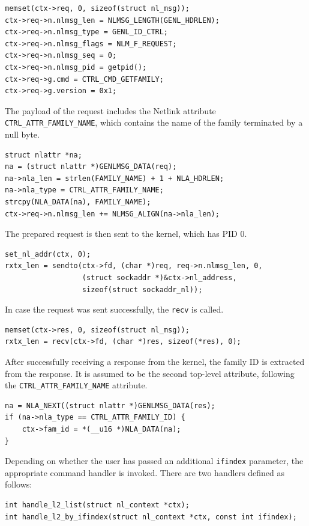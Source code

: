 \documentclass[10pt, letterpaper]{article}
\begin{document}
\begin{lstlisting}[caption={Request message initialization}]
memset(ctx->req, 0, sizeof(struct nl_msg));
ctx->req->n.nlmsg_len = NLMSG_LENGTH(GENL_HDRLEN);
ctx->req->n.nlmsg_type = GENL_ID_CTRL;
ctx->req->n.nlmsg_flags = NLM_F_REQUEST;
ctx->req->n.nlmsg_seq = 0;
ctx->req->n.nlmsg_pid = getpid();
ctx->req->g.cmd = CTRL_CMD_GETFAMILY;
ctx->req->g.version = 0x1;
\end{lstlisting}

The payload of the request includes the Netlink attribute
\texttt{CTRL\_ATTR\_FAMILY\_NAME}, which contains the name of the family terminated by a
null byte.
\begin{lstlisting}[caption={Request message payload}]
struct nlattr *na;
na = (struct nlattr *)GENLMSG_DATA(req);
na->nla_len = strlen(FAMILY_NAME) + 1 + NLA_HDRLEN;
na->nla_type = CTRL_ATTR_FAMILY_NAME;
strcpy(NLA_DATA(na), FAMILY_NAME);
ctx->req->n.nlmsg_len += NLMSG_ALIGN(na->nla_len);
\end{lstlisting}

The prepared request is then sent to the kernel, which has PID 0.
\begin{lstlisting}[caption={Sending the request}]
set_nl_addr(ctx, 0);
rxtx_len = sendto(ctx->fd, (char *)req, req->n.nlmsg_len, 0,
                  (struct sockaddr *)&ctx->nl_address,
                  sizeof(struct sockaddr_nl));
\end{lstlisting}

In case the request was sent successfully, the \texttt{recv} is called.
\begin{lstlisting}[caption={Receiving a response}]
memset(ctx->res, 0, sizeof(struct nl_msg));
rxtx_len = recv(ctx->fd, (char *)res, sizeof(*res), 0);
\end{lstlisting}

After successfully receiving a response from the kernel, the family ID is extracted from
the response. It is assumed to be the second top-level attribute, following the
\texttt{CTRL\_ATTR\_FAMILY\_NAME} attribute.
\begin{lstlisting}[caption={Family ID parsing}]
na = NLA_NEXT((struct nlattr *)GENLMSG_DATA(res);
if (na->nla_type == CTRL_ATTR_FAMILY_ID) {
    ctx->fam_id = *(__u16 *)NLA_DATA(na);
}
\end{lstlisting}

Depending on whether the user has passed an additional \texttt{ifindex} parameter, the
appropriate command handler is invoked. There are two handlers defined as follows:
\begin{lstlisting}[caption={Core functionality functions}]
int handle_l2_list(struct nl_context *ctx);
int handle_l2_by_ifindex(struct nl_context *ctx, const int ifindex);
\end{lstlisting}
\end{document}
